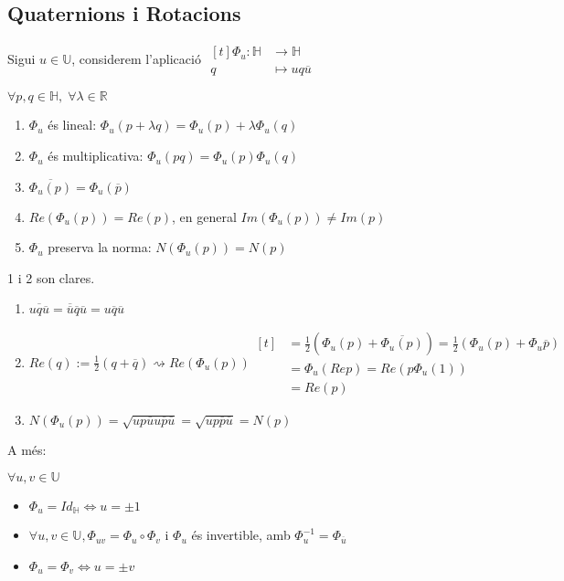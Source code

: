 \documentclass[a4paper,12pt]{article}
\begin{document}
	\subsection{Quaternions i Rotacions}
	Sigui $u \in \mathbb{U}$, considerem l'aplicació $\begin{aligned}[t]\Phi_u: \mathbb{H} &\to \mathbb{H}\\q &\mapsto uq\overline{u}\end{aligned}$
	\begin{proposicio}
		$\forall p, q \in \mathbb{H},\;\forall \lambda \in \mathbb{R}$
		\begin{enumerate}
			\item $\Phi_u$ és lineal: $\Phi_u(p + \lambda q) = \Phi_u(p) + \lambda\Phi_u(q)$
			\item $\Phi_u$ és multiplicativa: $\Phi_u(pq) = \Phi_u(p)\Phi_u(q)$
			\item $\overline{\Phi_u(p)} = \Phi_u(\overline{p})$
			\item $Re(\Phi_u(p)) = Re(p)$, en general $Im(\Phi_u(p)) \neq Im(p)$
			\item $\Phi_u$ preserva la norma: $N(\Phi_u(p)) = N(p)$
		\end{enumerate}
	\end{proposicio}
	\begin{demostracio}
		1 i 2 son clares.
		\begin{enumerate}\addtocounter{enumi}{2}
			\item $\overline{uq\overline{u}} = \overline{\overline{u}}\overline{q}\overline{u} = u\overline{q}\overline{u}$
			\item $Re(q) := \frac{1}{2}(q + \overline{q}) \rightsquigarrow Re(\Phi_u(p)) \begin{aligned}[t]
				&= \frac{1}{2}(\Phi_u(p) + \overline{\Phi_u(p)}) =  \frac{1}{2}(\Phi_u(p) + \Phi_u{\overline{p}})\\
				&= \Phi_u(Re p) = Re(p \Phi_u(1))\\
				&= Re(p)
			\end{aligned}$
			\item $N(\Phi_u(p)) = \sqrt{up\overline{u}u\overline{p}\overline{u}} = \sqrt{up\overline{p}\overline{u}} = N(p)$
		\end{enumerate}
	\end{demostracio}
	A més:
	\begin{proposicio} $\forall u,v \in \mathbb{U}$
		\begin{itemize}
			\item $\Phi_u = Id_\mathbb{H} \iff u = \pm 1$
			\item $\forall u, v \in \mathbb{U}, \Phi_{uv} = \Phi_u \circ \Phi_v$ i $\Phi_u$ és invertible, amb $\Phi_u^{-1} = \Phi_{\overline{u}}$
			\item $\Phi_u = \Phi_v \iff u = \pm v$
		\end{itemize}
	\end{proposicio}
\end{document}
